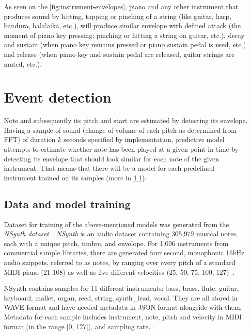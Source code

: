 
As seen on the \cref{fig:instrument-envelopes}, piano and any other instrument that produces sound by hitting, tapping
or pinching of a string (like guitar, harp, bandura, balalaika, etc.), will produce similar envelope with defined
attack (the moment of piano key pressing; pinching or hitting a string on guitar, etc.), decay and sustain (when piano
key remains pressed or piano sustain pedal is used, etc.) and release (when piano key and sustain pedal are released,
guitar strings are muted, etc.).


\section{Event detection}\label{sec:event-detection}

Note and subsequently its pitch and start are estimated by detecting its envelope. Having a sample of sound (change of
volume of each pitch as determined from \ac{FFT}) of duration $k$ seconds specified by implementation, predictive model
attempts to estimate whether note has been played at a given point in time by detecting its envelope that should look
similar for each note of the given instrument. That means that there will be a model for each predefined instrument
trained on its samples (more in \cref{subsec:data-and-model-training}).

\subsection{Data and model training}\label{subsec:data-and-model-training}
Dataset for training of the above-mentioned models was generated from the \textit{NSynth dataset}~\cite{nsynth2017}.
\textit{NSynth} is an audio dataset containing 305,979 musical notes, each with a unique pitch, timbre, and envelope.
For 1,006 instruments from commercial sample libraries, there are generated four second, monophonic 16kHz audio
snippets, referred to as notes, by ranging over every pitch of a standard MIDI piano (21-108) as well as five different
velocities (25, 50, 75, 100, 127)~\cite{nsynth2017}.

NSynth contains samples for 11 different instruments: bass, brass, flute, guitar, keyboard, mallet, organ, reed,
string, synth\_lead, vocal. They are all stored in \ac{WAVE} format and have needed metadata in JSON format alongside
with them. Metadata for each sample includes instrument, note, pitch and velocity in \ac{MIDI} format (in the range
[0, 127]), and sampling rate.

